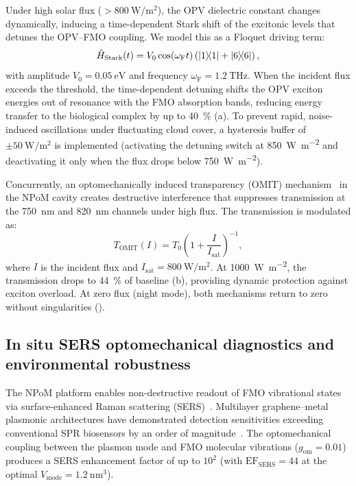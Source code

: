 \documentclass[12pt]{iopart}
\begin{document}
Under high solar flux ($> \qty{800}{\W\per\m\squared}$), the OPV dielectric constant changes dynamically, inducing a time-dependent Stark shift of the excitonic levels that detunes the OPV--FMO coupling.
We model this as a Floquet driving term:
\begin{equation}
\hat{H}_{\mathrm{Stark}}(t) = V_0 \cos(\omega_{\mathrm{F}} t) \left( \dyad{1}{1} + \dyad{6}{6} \right),
\label{eq:stark_detuning}
\end{equation}
with amplitude $V_0 = \qty{0.05}{\eV}$ and frequency $\omega_{\mathrm{F}} = \qty{1.2}{\THz}$.
When the incident flux exceeds the threshold, the time-dependent detuning shifts the OPV exciton energies out of resonance with the FMO absorption bands, reducing energy transfer to the biological complex by up to \qty{40}{\percent} (a). To prevent rapid, noise-induced oscillations under fluctuating cloud cover, a hysteresis buffer of $\pm \qty{50}{\W\per\m\squared}$ is implemented (activating the detuning switch at \qty{850}{\W\per\m\squared} and deactivating it only when the flux drops below \qty{750}{\W\per\m\squared}).

Concurrently, an optomechanically induced transparency (OMIT) mechanism~\cite{Aspelmeyer2014} in the NPoM cavity creates destructive interference that suppresses transmission at the \qty{750}{\nm} and \qty{820}{\nm} channels under high flux.
The transmission is modulated as:
\begin{equation}
T_{\mathrm{OMIT}}(I) = T_0 \left(1 + \frac{I}{I_{\mathrm{sat}}}\right)^{-1},
\label{eq:omit}
\end{equation}
where $I$ is the incident flux and $I_{\mathrm{sat}} = \qty{800}{\W\per\m\squared}$.
At \qty{1000}{\W\per\m\squared}, the transmission drops to \qty{44}{\percent} of baseline (b), providing dynamic protection against exciton overload.
At zero flux (night mode), both mechanisms return to zero without singularities ().

\subsection{In situ SERS optomechanical diagnostics and environmental robustness}

The NPoM platform enables non-destructive readout of FMO vibrational states via surface-enhanced Raman scattering (SERS)~\cite{Langer2020}.
Multilayer graphene--metal plasmonic architectures have demonstrated detection sensitivities exceeding conventional SPR biosensors by an order of magnitude~\cite{Bahmani2026}.
The optomechanical coupling between the plasmon mode and FMO molecular vibrations ($g_{\mathrm{om}} = 0.01$) produces a SERS enhancement factor of up to $10^2$ (with $\mathrm{EF}_{\mathrm{SERS}} = 44$ at the optimal $V_{\mathrm{mode}} = \qty{1.2}{\nm\cubed}$).
\end{document}
